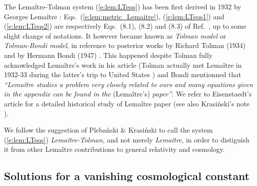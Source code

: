 \begin{hist}
The Lemaître-Tolman system (\ref{e:lem:LTeqs}) has been first derived
in 1932 by Georges Lemaître \cite{Lemai32}:
Eqs.~(\ref{e:lem:metric_Lemaitre}), (\ref{e:lem:LTeqs1}) and (\ref{e:lem:LTeqs2}) are
respectively Eqs.~(8.1), (8.2) and (8.3) of Ref.~\cite{Lemai32}, up to some slight
change of notations.
It however became known as \emph{Tolman model}
or \emph{Tolman-Bondi model}, in reference
to posterior works by Richard Tolman (1934) \cite{Tolma34}
and by Hermann Bondi (1947) \cite{Bondi47}.
This happened despite Tolman fully acknowledged Lemaître's work \cite{Lemai32} in his
article \cite{Tolma34} (Tolman actually met Lemaître in 1932-33 during
the latter's trip to United States \cite{Eisen93}) and Bondi \cite{Bondi47} mentionned
that \emph{``Lemaître studies a problem very closely related to ours
and many equations given in the appendix can be found in the} (Lemaître's) \emph{paper''}.
We refer to Eisenstaedt's article \cite{Eisen93} for a detailed historical
study of Lemaître paper \cite{Lemai32} (see also Krasi\'nski's note \cite{Krasi97}).

We follow the suggestion of Pleba\'nski \& Krasi\'nski \cite{PlebaK06}
to call the system (\ref{e:lem:LTeqs}) \emph{Lemaître-Tolman}, and not
merely \emph{Lemaître}, in order to distiguish it from other Lemaître contributions
to general relativity and cosmology.
\end{hist}


\subsection{Solutions for a vanishing cosmological constant}

